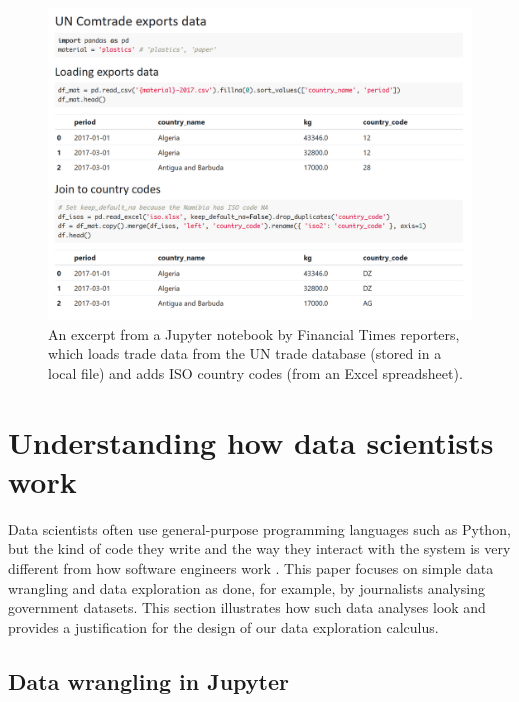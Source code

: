 \documentclass[acmsmall,anonymous,fleqn]{acmart}\settopmatter{printfolios=false,printccs=false,printacmref=false}
\theoremstyle{plain}
\theoremstyle{definition}
\begin{document}
\begin{figure}[b]
\includegraphics[scale=0.5]{notebook.png}
\caption{An excerpt from a Jupyter notebook by Financial Times reporters, which loads trade
  data from the UN trade database (stored in a local file) and adds ISO country codes (from
  an Excel spreadsheet).}
\label{fig:ft-uncomtrade}
\end{figure}


\section{Understanding how data scientists work}
\label{sec:background}

Data scientists often use general-purpose programming languages such as Python, but the kind of
code they write and the way they interact with the system is very different from how software
engineers work \cite{workflow}. This paper focuses on simple data wrangling and data exploration as done, for
example, by journalists analysing government datasets. This section illustrates how such data
analyses look and provides a justification for the design of our data exploration calculus.


\subsection{Data wrangling in Jupyter}
\label{sec:background-jupyter}
\end{document}
